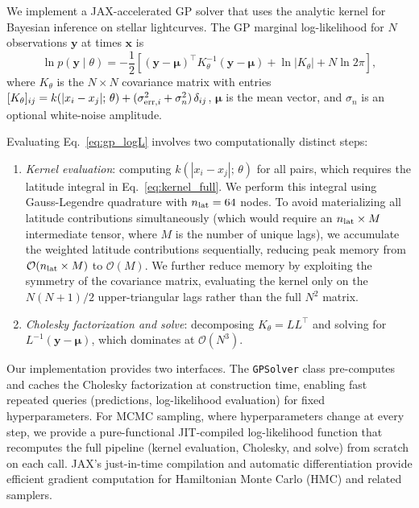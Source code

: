 \documentclass[preprint]{aastex702}
\newcommand{\code}[1]{{\texttt{#1}}}
\begin{document}
We implement a JAX-accelerated GP solver that uses the analytic kernel for Bayesian inference on stellar lightcurves. The GP marginal log-likelihood for $N$ observations $\mathbf{y}$ at times $\mathbf{x}$ is
\begin{equation}
    \ln p(\mathbf{y} \mid \theta) = -\frac{1}{2}\left[
        (\mathbf{y} - \boldsymbol{\mu})^\top K_\theta^{-1} (\mathbf{y} - \boldsymbol{\mu})
        + \ln |K_\theta|
        + N \ln 2\pi
    \right],
    \label{eq:gp_logL}
\end{equation}
where $K_\theta$ is the $N \times N$ covariance matrix with entries $[K_\theta]_{ij} = k(|x_i - x_j|;\, \theta) + (\sigma_{{\rm err},i}^2 + \sigma_n^2)\,\delta_{ij}$, $\boldsymbol{\mu}$ is the mean vector, and $\sigma_n$ is an optional white-noise amplitude.

Evaluating Eq.~\eqref{eq:gp_logL} involves two computationally distinct steps:
\begin{enumerate}[nosep]
    \item \textit{Kernel evaluation}: computing $k(|x_i - x_j|;\, \theta)$ for all pairs, which requires the latitude integral in Eq.~\eqref{eq:kernel_full}. We perform this integral using Gauss-Legendre quadrature with $n_{\rm lat} = 64$ nodes. To avoid materializing all latitude contributions simultaneously (which would require an $n_{\rm lat} \times M$ intermediate tensor, where $M$ is the number of unique lags), we accumulate the weighted latitude contributions sequentially, reducing peak memory from $\mathcal{O}(n_{\rm lat} \times M)$ to $\mathcal{O}(M)$. We further reduce memory by exploiting the symmetry of the covariance matrix, evaluating the kernel only on the $N(N+1)/2$ upper-triangular lags rather than the full $N^2$ matrix.
    \item \textit{Cholesky factorization and solve}: decomposing $K_\theta = L L^\top$ and solving for $L^{-1}(\mathbf{y} - \boldsymbol{\mu})$, which dominates at $\mathcal{O}(N^3)$.
\end{enumerate}

Our implementation provides two interfaces. The \code{GPSolver} class pre-computes and caches the Cholesky factorization at construction time, enabling fast repeated queries (predictions, log-likelihood evaluation) for fixed hyperparameters. For MCMC sampling, where hyperparameters change at every step, we provide a pure-functional JIT-compiled log-likelihood function that recomputes the full pipeline (kernel evaluation, Cholesky, and solve) from scratch on each call. JAX's just-in-time compilation and automatic differentiation provide efficient gradient computation for Hamiltonian Monte Carlo (HMC) and related samplers.
\end{document}
